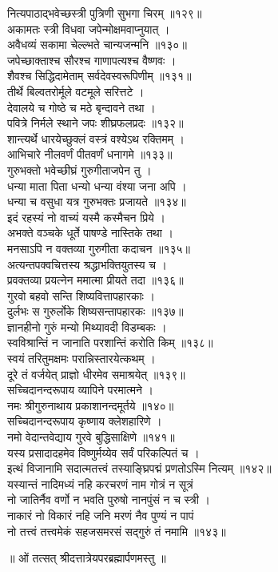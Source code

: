 नित्यपाठाद्भवेच्छस्त्री पुत्रिणी सुभगा चिरम् ॥१२९॥\\
अकामतः स्त्री विधवा जपेन्मोक्षमवाप्नुयात् ।\\
अवैधव्यं सकामा चेल्ल्भते चान्यजन्मनि ॥१३०॥\\
जपेच्छाक्ताश्च सौरश्च गाणापत्यश्च वैष्णवः ।\\
शैवश्च सिद्धिदामेताम् सर्वदेवस्वरूपिणीम् ॥१३१॥\\
तीर्थे बिल्वतरोर्मूले वटमूले सरित्तटे ।\\
देवालये च गोष्ठे च मठे बृन्दावने तथा ।\\
पवित्रे निर्मले स्थाने जपः शीघ्रफलप्रदः ॥१३२॥\\
शान्त्यर्थे धारयेच्छुक्लं वस्त्रं वश्येऽथ रक्तिमम् ।\\
आभिचारे नीलवर्णं पीतवर्णं धनागमे ॥१३३॥\\
गुरुभक्तो भवेच्छीघ्रं गुरुगीताजपेन तु ।\\
धन्या माता पिता धन्यो धन्या वंश्या जना अपि ।\\
धन्या च वसुधा यत्र गुरुभक्तः प्रजायते ॥१३४॥\\
इदं रहस्यं नो वाच्यं यस्मै कस्मैचन प्रिये ।\\
अभक्ते वञ्चके धूर्ते पाषण्डे नास्तिके तथा ।\\
मनसाऽपि न वक्तव्या गुरुगीता कदाचन ॥१३५॥\\
अत्यन्तपक्वचित्तस्य श्रद्धाभक्तियुतस्य च ।\\
प्रवक्तव्या प्रयत्नेन ममात्मा प्रीयते तदा ॥१३६॥\\
गुरवो बहवो सन्ति शिष्यवित्तापहारकाः ।\\
दुर्लभः स गुरुर्लोके शिष्यसन्तापहारकः ॥१३७॥\\
ज्ञानहीनो गुरुं मन्यो मिथ्यावदी विडम्बकः ।\\
स्वविश्रान्तिं न जानाति परशान्तिं करोति किम् ॥१३८॥\\
स्वयं तरितुमक्षमः परान्निस्तारयेत्कथम् ।\\
दूरे तं वर्जयेत् प्राज्ञो धीरमेव समाश्रयेत् ॥१३९॥\\
सच्चिदानन्दरूपाय व्यापिने परमात्मने ।\\
नमः श्रीगुरुनाथाय प्रकाशानन्दमूर्तये ॥१४०॥\\
सच्चिदानन्दरूपाय कृष्णाय क्लेशहारिणे ।\\
नमो वेदान्तवेद्याय गुरवे बुद्धिसाक्षिणे ॥१४१॥\\
यस्य प्रसादादहमेव विष्णुर्मय्येव सर्वं परिकल्पितं च ।\\
इत्थं विजानामि सदात्मतत्त्वं तस्याङ्घ्रिपद्मं प्रणतोऽस्मि नित्यम् ॥१४२॥\\
यस्यान्तं नादिमध्यं नहि करचरणं नाम गोत्रं न सूत्रं\\
नो जातिर्नैव वर्णो न भवति पुरुषो नानपुंसं न च स्त्री ।\\
नाकारं नो विकारं नहि जनि मरणं नैव पुण्यं न पापं\\
नो तत्त्वं तत्त्वमेकं सहजसमरसं सद्गुरुं तं नमामि ॥१४३॥


\begin{center}॥ ओं तत्सत् श्रीदत्तात्रेयपरब्रह्मार्पणमस्तु ॥\end{center}


